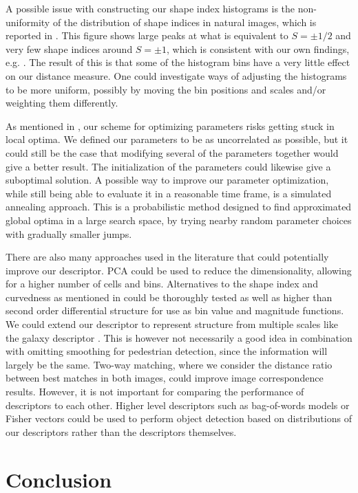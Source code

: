 \documentclass[thesis.tex]{subfiles}
\begin{document}
A possible issue with constructing our shape index histograms is the non-uniformity of the distribution of shape indices in natural images, which is reported in \citep[Fig. 3]{lillholm2009statistics}. This figure shows large peaks at what is equivalent to $S = \pm 1/2$ and very few shape indices around $S = \pm 1$, which is consistent with our own findings, e.g. . The result of this is that some of the histogram bins have a very little effect on our distance measure. One could investigate ways of adjusting the histograms to be more uniform, possibly by moving the bin positions and scales and/or weighting them differently.

As mentioned in , our scheme for optimizing parameters risks getting stuck in local optima. We defined our parameters to be as uncorrelated as possible, but it could still be the case that modifying several of the parameters together would give a better result. The initialization of the parameters could likewise give a suboptimal solution. A possible way to improve our parameter optimization, while still being able to evaluate it in a reasonable time frame, is a simulated annealing approach. This is a probabilistic method designed to find approximated global optima in a large search space, by trying nearby random parameter choices with gradually smaller jumps. 

There are also many approaches used in the literature that could potentially improve our descriptor. PCA could be used to reduce the dimensionality, allowing for a higher number of cells and bins. Alternatives to the shape index and curvedness as mentioned in  could be thoroughly tested as well as higher than second order differential structure for use as bin value and magnitude functions. We could extend our descriptor to represent structure from multiple scales like the galaxy descriptor . This is however not necessarily a good idea in combination with omitting smoothing for pedestrian detection, since the information will largely be the same. Two-way matching, where we consider the distance ratio between best matches in both images, could improve image correspondence results. However, it is not important for comparing the performance of descriptors to each other. Higher level descriptors such as bag-of-words models or Fisher vectors \cite{sanchez2013image} could be used to perform object detection based on distributions of our descriptors rather than the descriptors themselves.

\section{Conclusion}

\subbibliography
\end{document}
